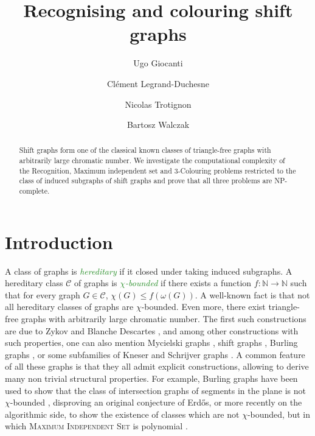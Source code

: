 \documentclass[11pt,a4aper]{article}
\title{Recognising and colouring shift graphs}
\date{}
\author{
  Ugo Giocanti\footnotemark[1] \and
  Cl\'ement Legrand-Duchesne\footnotemark[1]
  \and
  Nicolas Trotignon\footnotemark[2]  
  \and
  Bartosz Walczak\footnotemark[1]
}
\renewcommand{\le}{\leqslant}
\newcommand{\defin}[1]{\emph{\textcolor{ForestGreen}{#1}}}
\begin{document}
\maketitle

\renewcommand{\thefootnote}{\fnsymbol{footnote}} %


\renewcommand{\thefootnote}{\arabic{footnote}} %



\begin{abstract}
  Shift graphs form one of the classical known classes of triangle-free graphs
  with arbitrarily large chromatic number. We investigate the computational
  complexity of the Recognition, Maximum independent set and 3-Colouring
  problems restricted to the class of induced subgraphs of shift graphs and prove that all three problems are NP-complete. 
\end{abstract}

\section{Introduction}
\label{sec: intro}
A class of graphs is \defin{hereditary} if it closed under taking induced
subgraphs.  A hereditary class $\mathcal C$ of graphs is \defin{$\chi$-bounded} if there
exists a function $f:\mathbb N\to \mathbb N$ such that for every graph $G\in \mathcal C$,
$\chi(G) \le f(\omega(G))$.  A well-known fact is that not all hereditary classes of graphs are
$\chi$-bounded. Even more, there exist triangle-free graphs with arbitrarily large
chromatic number. The first such constructions are due to Zykov \cite{Zyk49} and Blanche Descartes \cite{Descartes}, and among other constructions with such properties, one can also mention Mycielski graphs \cite{Mycielski1955}, shift graphs \cite{EH68}, Burling graphs \cite{Burling},
or some subfamilies of Kneser and Schrijver graphs \cite{lovasz1973Covering, Schrijver}. A common feature of all these graphs is that they all admit explicit constructions, allowing to derive many non trivial structural properties. 
For example, Burling graphs have been used to show that the class of intersection graphs of segments in  the plane is not $\chi$-bounded \cite{scott2014Disprove}, disproving an original conjecture of Erd\H{o}s, or more recently on the algorithmic side, to show the existence of classes which are not $\chi$-bounded, but in which \textsc{Maximum Independent Set} is polynomial \cite{rzazewski2024Polynomial}.
\end{document}
